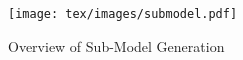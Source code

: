\begin{figure}[!htbp]
\centering
\texttt{[image: tex/images/submodel.pdf]}
\caption{Overview of Sub-Model Generation} 
\label{fig:Sub_model}
\end{figure}











